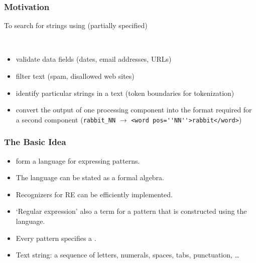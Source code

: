 \begin{frame}[fragile]
  \frametitle{Motivation}

  \begin{description}[<+->]
  \item [Task:] To search for strings using (partially
      specified) 
  \item [Why:]\hfill\\ 
    \begin{itemize}
    \item validate data fields (dates, email addresses, URLs)
    \item filter text (spam, disallowed web sites)
    \item identify particular strings in a text (token boundaries for tokenization)
    \item convert the output of one processing component into the format
          required for a second component  (\verb!rabbit_NN!
          $\rightarrow$ \verb!<word pos=''NN''>rabbit</word>!) 
    \end{itemize}

  \end{description}
\end{frame}


\begin{frame}[fragile]
  \frametitle{The Basic Idea}

  \begin{itemize}[<+->]
    \item {} form a language for expressing patterns.
    \item The language can be stated as a formal algebra.
    \item Recognizers for RE can be efficiently implemented.
    \item `Regular expression' also a term for a pattern that is
      constructed using the language.
    \item Every pattern specifies a .
    \item Text string: a sequence of letters, numerals, spaces, tabs,
      punctuation, \ldots
  \end{itemize}
\end{frame}

